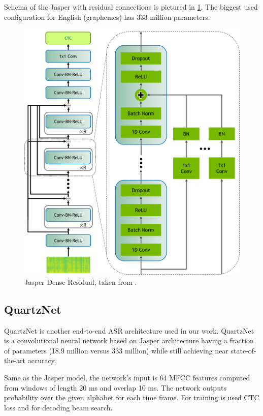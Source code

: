 Schema of the Jasper with residual connections is pictured in \cref{fig:jasper_dr}. The biggest used configuration for English (graphemes) has 333 million parameters.

\begin{figure}[h]
	\centering
	\includegraphics[scale=0.7]{img/JasperVerticalDR4.png}
	\caption{Jasper Dense Residual, taken from .}
	\label{fig:jasper_dr}
\end{figure}

\subsection{QuartzNet}
\label{intro:quartznet}

QuartzNet  is another end-to-end ASR architecture used in our work. QuartzNet is a convolutional neural network based on Jasper  architecture having a fraction of parameters (18.9 million versus 333 million) while still achieving near state-of-the-art accuracy.

Same as the Jasper model, the network's input is 64 MFCC features computed from windows of length 20 ms and overlap 10 ms. The network outputs probability over the given alphabet for each time frame. For training is used CTC loss and for decoding beam search.

